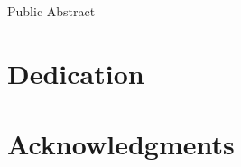 \documentclass[12pt]{report}
\renewcommand\[{\begin{equation}}
\renewcommand\]{\end{equation}}
\begin{document}
\else

\fi

\ifx\mypublicabstract\undefined
\else
\vfill

\pagebreak

\begin{center}


{\large \mytitle}


\vfill


\myauthor


\vfill


Public Abstract


\vfill


\end{center}




\vfill

\fi

\ifx\mygrants\undefined
\else
  \mygrants
\fi

\pagebreak


\ifx\mydedication\undefined
\else
\chapter*{Dedication}
  \mydedication
\fi

\ifx\myacknowledgements\undefined
\else
  \chapter*{Acknowledgments}
  \myacknowledgements
\fi

\pagebreak


\tableofcontents

\pagebreak


\listoffigures

\pagebreak


\listoftables

\pagebreak


\pagestyle{myheadings}

\ifx\mylinespace\undefined
\else
  \mylinespace
\fi

\emergencystretch=10pt
\newcommand{\V}[1]{\boldsymbol{\mathbf{#1}}}
\newcommand{\vect}[1]{\boldsymbol{\mathbf{#1}}}
\newcommand{\arraybegin}[1]{\begin{IEEEeqnarraybox*}[][c]{#1}}
\newcommand{\arrayend}{\end{IEEEeqnarraybox*}}
\newcommand{\unaryminus}{\scalebox{0.75}[1.0]{\( - \)}}
\newcommand{\ubar}[1]{\underaccent{\bar}{#1}}
\end{document}
